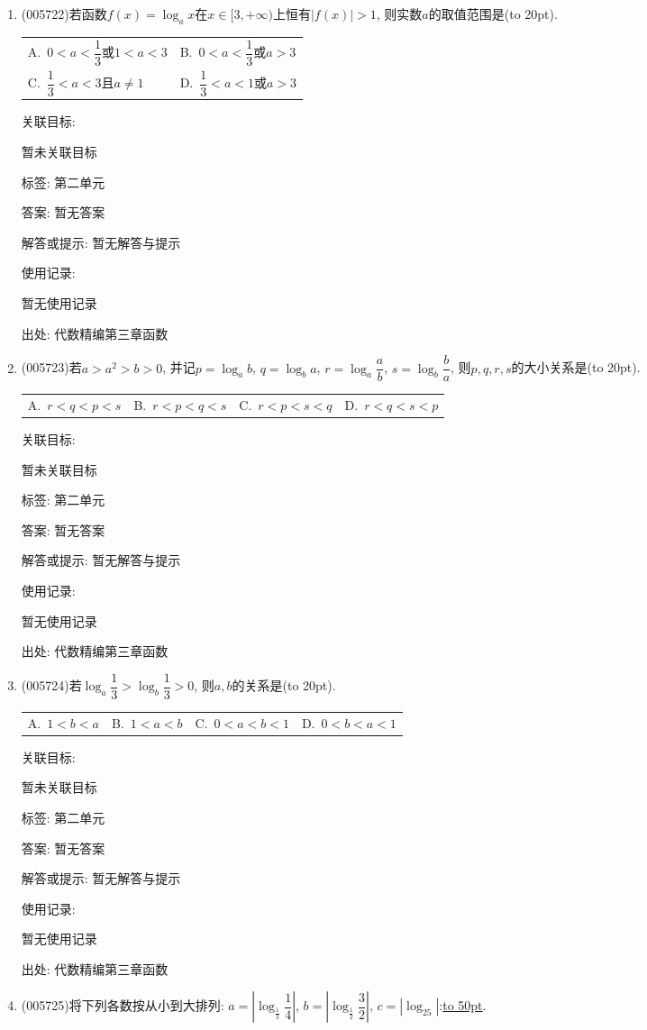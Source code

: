 \documentclass[10pt,a4paper]{article}
\newcommand{\blank}[1]{\underline{\hbox to #1pt{}}}
\newcommand{\bracket}[1]{(\hbox to #1pt{})}
\newcommand{\twoch}[4]{\par\begin{tabular}{p{.46\textwidth}p{.46\textwidth}}
A.~#1& B.~#2\\
C.~#3& D.~#4
\end{tabular}}
\newcommand{\fourch}[4]{\par\begin{tabular}{p{.23\textwidth}p{.23\textwidth}p{.23\textwidth}p{.23\textwidth}}
A.~#1 &B.~#2& C.~#3& D.~#4
\end{tabular}}
\begin{document}
\begin{enumerate}[1.]
关联目标:

暂未关联目标



标签: 第二单元

答案: 暂无答案

解答或提示: 暂无解答与提示

使用记录:

暂无使用记录


出处: 代数精编第三章函数
\item { (005722)}若函数$f(x)=\log_ax$在$x\in [3,+\infty)$上恒有$|f(x)|>1$, 则实数$a$的取值范围是\bracket{20}.
\twoch{$0<a<\dfrac 13$或$1<a<3$}{$0<a<\dfrac 13$或$a>3$}{$\dfrac 13<a<3$且$a\ne 1$}{$\dfrac 13<a<1$或$a>3$}


关联目标:

暂未关联目标



标签: 第二单元

答案: 暂无答案

解答或提示: 暂无解答与提示

使用记录:

暂无使用记录


出处: 代数精编第三章函数
\item { (005723)}若$a>a^2>b>0$, 并记$p=\log_ab$, $q=\log_ba$, $r=\log_a\dfrac ab$, $s=\log_b\dfrac ba$, 则$p,q,r,s$的大小关系是\bracket{20}.
\fourch{$r<q<p<s$}{$r<p<q<s$}{$r<p<s<q$}{$r<q<s<p$}


关联目标:

暂未关联目标



标签: 第二单元

答案: 暂无答案

解答或提示: 暂无解答与提示

使用记录:

暂无使用记录


出处: 代数精编第三章函数
\item { (005724)}若$\log_a\dfrac 13>\log_b\dfrac 13>0$, 则$a,b$的关系是\bracket{20}.
\fourch{$1<b<a$}{$1<a<b$}{$0<a<b<1$}{$0<b<a<1$}


关联目标:

暂未关联目标



标签: 第二单元

答案: 暂无答案

解答或提示: 暂无解答与提示

使用记录:

暂无使用记录


出处: 代数精编第三章函数
\item { (005725)}将下列各数按从小到大排列: $a=|\log_{\frac 13}\dfrac 14|$, $b=|\log_{\frac 12}\dfrac 32|$, $c=|\log_25|$:\blank{50}.



\end{enumerate}
\end{document}
